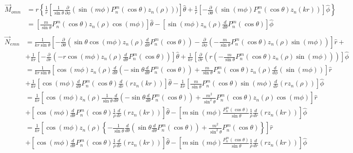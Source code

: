 \begin{align*}
    \Vec{M}_{omn}&=r\left\lbrace\frac{1}{r}\left[\frac{1}{\sin\theta}\frac{\partial }{\partial\phi}(\sin (m\phi)P_n^m(\cos\theta)z_n(\rho)))\right]\hat{\theta}+\frac{1}{r}\left[-\frac{\partial }{\partial\theta}(\sin (m\phi)P_n^m(\cos\theta)z_n(kr))\right]\hat{\phi}\right\rbrace\\
    &=\left[\frac{m}{\sin\theta}P_n^m(\cos\theta)z_n(\rho)\cos (m\phi)\right]\hat{\theta}-\left[\sin(m\phi)z_n(\rho)\frac{d}{d\theta}P_n^m(\cos\theta)\right]\hat{\phi}\\\
\end{align*}
\begin{align*}
    \Vec{N}_{emn}&=\frac{1}{kr\sin\theta}\left[-\frac{\partial}{\partial\theta} (\sin\theta \cos(m\phi)z_n(\rho)\frac{d}{d\theta}P_n^m(\cos\theta))-\frac{\partial}{\partial\phi}(-\frac{m}{\sin\theta}P_n^m(\cos\theta)z_n(\rho)\sin (m\phi))\right]\hat{r}+\\
    &+\frac{1}{kr}\left[-\frac{\partial}{\partial r}(-r\cos(m\phi)z_n(\rho)\frac{d}{d\theta}P_n^m(\cos\theta))\right]\hat{\theta}+\frac{1}{kr}\left[\frac{\partial}{\partial r}\left(r (-\frac{m}{\sin\theta}P_n^m(\cos\theta)z_n(\rho)\sin (m\phi))\right)\right]\hat{\phi}\\
    &=\frac{1}{kr\sin\theta}\left[\cos(m\phi)z_n(\rho)\frac{d}{d\theta} \left(-\sin\theta \frac{d}{d\theta}P_n^m(\cos\theta)\right)+\frac{m}{\sin\theta}P_n^m(\cos\theta)z_n(\rho)\frac{d}{d\phi}\left(\sin (m\phi)\right)\right]\hat{r}\\&+\frac{1}{kr}\left[\cos(m\phi)\frac{d}{d\theta}P_n^m(\cos\theta)\frac{d}{d r}(rz_n(kr))\right]\hat{\theta}-\frac{1}{kr}\left[\frac{m}{\sin\theta}P_n^m(\cos\theta)\sin (m\phi)\frac{d}{d r}(r z_n(\rho))\right]\hat{\phi}\\
     &=\frac{1}{kr}\left[\cos(m\phi)z_n(\rho)\frac{1}{\sin\theta}\frac{d}{d\theta} \left(-\sin\theta \frac{d}{d\theta}P_n^m(\cos\theta)\right)+\frac{m^2}{\sin^2\theta}P_n^m(\cos\theta)z_n(\rho)\cos(m\phi)\right]\hat{r}\\
     &+\left[\cos(m\phi)\frac{d}{d\theta}P_n^m(\cos\theta)\frac{1}{\rho}\frac{d}{d r}(rz_n(kr))\right]\hat{\theta}-\left[m\sin(m\phi)\frac{P_n^m(\cos\theta)}{\sin\theta}\frac{1}{\rho}\frac{d}{d r}(rz_n(kr))\right]\hat{\phi}\\
     &=\frac{1}{kr}\left[\cos(m\phi)z_n(\rho)\left\lbrace-\frac{1}{\sin\theta}\frac{d}{d\theta} \left(\sin\theta \frac{d}{d\theta}P_n^m(\cos\theta)\right)+\frac{m^2}{\sin^2\theta}P_n^m(\cos\theta)\right\rbrace\right]\hat{r}\\
     &+\left[\cos(m\phi)\frac{d}{d\theta}P_n^m(\cos\theta)\frac{1}{\rho}\frac{d}{d r}(rz_n(kr))\right]\hat{\theta}-\left[m\sin(m\phi)\frac{P_n^m(\cos\theta)}{\sin\theta}\frac{1}{\rho}\frac{d}{d r}(rz_n(kr))\right]\hat{\phi}\\
\end{align*}

